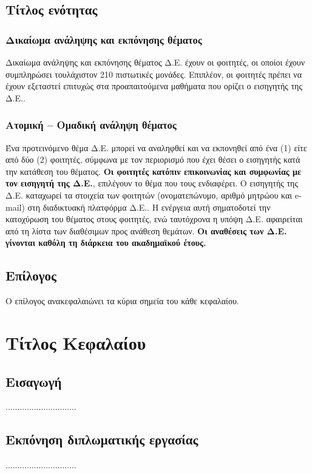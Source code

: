 \documentclass[twoside, a4paper, 11pt]{article}
\begin{document}
\subsection{Τίτλος ενότητας}

\subsubsection{Δικαίωμα ανάληψης και εκπόνησης θέματος}
Δικαίωμα ανάληψης και εκπόνησης θέματος Δ.Ε. έχουν οι φοιτητές, οι οποίοι έχουν συμπληρώσει τουλάχιστον 210 πιστωτικές μονάδες. Επιπλέον, οι φοιτητές πρέπει να έχουν εξεταστεί επιτυχώς στα προαπαιτούμενα μαθήματα που ορίζει ο εισηγητής της Δ.Ε..

\subsubsection{Ατομική – Ομαδική ανάληψη θέματος}
Ένα προτεινόμενο θέμα Δ.Ε. μπορεί να αναληφθεί και να εκπονηθεί από ένα (1) είτε από δύο (2) φοιτητές, σύμφωνα με τον περιορισμό που έχει θέσει ο εισηγητής κατά την κατάθεση του θέματος. \textbf{Οι φοιτητές κατόπιν επικοινωνίας και συμφωνίας με τον εισηγητή της Δ.Ε.}, επιλέγουν το θέμα που τους ενδιαφέρει. Ο εισηγητής της Δ.Ε. καταχωρεί τα στοιχεία των φοιτητών (ονοματεπώνυμο, αριθμό μητρώου και e-mail) στη διαδικτυακή πλατφόρμα Δ.Ε.. Η ενέργεια αυτή σηματοδοτεί την κατοχύρωση του θέματος στους φοιτητές, ενώ ταυτόχρονα η υπόψη Δ.Ε. αφαιρείται από τη λίστα των διαθέσιμων προς ανάθεση θεμάτων. \textbf{Οι αναθέσεις των Δ.Ε. γίνονται καθόλη τη διάρκεια του ακαδημαϊκού έτους.}

\subsection{Επίλογος}
Ο επίλογος ανακεφαλαιώνει τα κύρια σημεία του κάθε κεφαλαίου.

\clearpage
\section{Τίτλος Κεφαλαίου}

\subsection{Εισαγωγή}
..............................

\subsection{Εκπόνηση διπλωματικής εργασίας } \label{subsection:problem-analysis}
..............................
\end{document}
